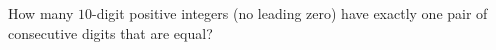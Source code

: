 How many $10$-digit positive integers (no leading zero) have exactly one pair of consecutive digits that are equal?
